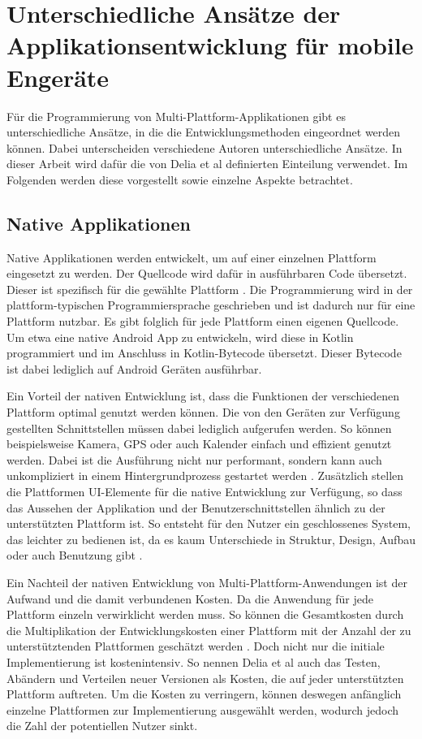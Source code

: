 \section{Unterschiedliche Ansätze der Applikationsentwicklung für mobile Engeräte}
\label{cha:3_2}
Für die Programmierung von Multi-Plattform-Applikationen gibt es unterschiedliche Ansätze, in die die Entwicklungsmethoden eingeordnet werden können. Dabei unterscheiden verschiedene Autoren unterschiedliche Ansätze. In dieser Arbeit wird dafür die von Delia et al \cite{IEEE_development_classes} definierten Einteilung verwendet. Im Folgenden werden diese vorgestellt sowie einzelne Aspekte betrachtet.

\subsection{Native Applikationen}
Native Applikationen werden entwickelt, um auf einer einzelnen Plattform eingesetzt zu werden. Der Quellcode wird dafür in ausführbaren Code übersetzt. Dieser ist spezifisch für die gewählte Plattform \cite{IEEE_development_classes}.
Die Programmierung wird in der plattform-typischen Programmiersprache geschrieben und ist dadurch nur für eine Plattform nutzbar. Es gibt folglich für jede Plattform einen eigenen Quellcode. Um etwa eine native Android App zu entwickeln, wird diese in Kotlin programmiert und im Anschluss in Kotlin-Bytecode übersetzt. Dieser Bytecode ist dabei lediglich auf Android Geräten ausführbar.

Ein Vorteil der nativen Entwicklung ist, dass die Funktionen der verschiedenen Plattform optimal genutzt werden können. Die von den Geräten zur Verfügung gestellten Schnittstellen müssen dabei lediglich aufgerufen werden. So können beispielsweise Kamera, GPS oder auch Kalender einfach und effizient genutzt werden. Dabei ist die Ausführung nicht nur performant, sondern kann auch unkompliziert in einem Hintergrundprozess gestartet werden \cite{IEEE_development_classes}.
Zusätzlich stellen die Plattformen UI-Elemente für die native Entwicklung zur Verfügung, so dass das Aussehen der Applikation und der Benutzerschnittstellen ähnlich zu der unterstützten Plattform ist. So entsteht für den Nutzer ein geschlossenes System, das leichter zu bedienen ist, da es kaum Unterschiede in Struktur, Design, Aufbau oder auch Benutzung gibt \cite{IEEE_Khackouch_Al}.

Ein Nachteil der nativen Entwicklung von Multi-Plattform-Anwendungen ist der Aufwand und die damit verbundenen Kosten. Da die Anwendung für jede Plattform einzeln verwirklicht werden muss. So können die Gesamtkosten durch die Multiplikation der Entwicklungskosten einer Plattform mit der Anzahl der zu unterstütztenden Plattformen geschätzt werden \cite{IEEE_Khackouch_Al}. Doch nicht nur die initiale Implementierung ist kostenintensiv. So nennen Delia et al \cite{IEEE_development_classes} auch das Testen, Abändern und Verteilen neuer Versionen als Kosten, die auf jeder unterstützten Plattform auftreten. 
Um die Kosten zu verringern, können deswegen anfänglich einzelne Plattformen zur Implementierung ausgewählt werden, wodurch jedoch die Zahl der potentiellen Nutzer sinkt.

